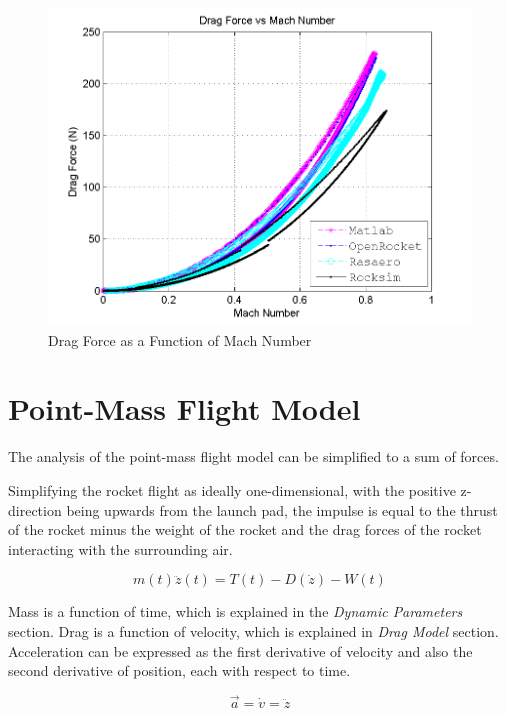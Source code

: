 \documentclass[]{book}
\begin{document}
\begin{figure}[htbp]
\centering
\includegraphics{images/plots/error_dragforce_plot.png}
\caption{Drag Force as a Function of Mach Number
\label{error_dragforce_v_plot_label}}
\end{figure}

\clearpage

\chapter{Point-Mass Flight Model}\label{point-mass-flight-model}

The analysis of the point-mass flight model can be simplified to a sum
of forces.

Simplifying the rocket flight as ideally one-dimensional, with the
positive z-direction being upwards from the launch pad, the impulse is
equal to the thrust of the rocket minus the weight of the rocket and the
drag forces of the rocket interacting with the surrounding air.

\begin{equation}
\label{eq_vertical_flight_eom}
m(t)\ddot{z}(t) = T(t) - D(\dot{z}) - W(t)
\end{equation}

Mass is a function of time, which is explained in the \emph{Dynamic
Parameters} section. Drag is a function of velocity, which is explained
in \emph{Drag Model} section. Acceleration can be expressed as the first
derivative of velocity and also the second derivative of position, each
with respect to time.

\begin{equation}
\vec{a} = \dot{v} = \ddot{z}
\end{equation}
\end{document}
